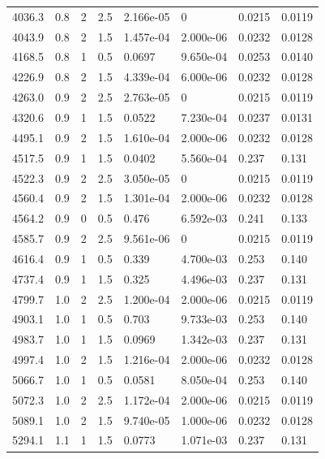 \documentclass[preview]{standalone}
\begin{document}
{{{\begin{tabular}{L{1.2cm}C{1.2cm} C{0.3cm}C{0.5cm} C{1.4cm}C{1.4cm} C{1.4cm}C{1.4cm}}
  4036.3  &   0.8  & 2     & 2.5 &  2.166e-05  & 0  & 0.0215 &  0.0119   \\ 
  4043.9  &   0.8  & 2     & 1.5 &  1.457e-04  & 2.000e-06  & 0.0232 &  0.0128   \\ 
  4168.5  &   0.8  & 1     & 0.5 &  0.0697  & 9.650e-04  & 0.0253 &  0.0140   \\ 
  4226.9  &   0.8  & 2     & 1.5 &  4.339e-04  & 6.000e-06  & 0.0232 &  0.0128   \\ 
  4263.0  &   0.9  & 2     & 2.5 &  2.763e-05  & 0  & 0.0215 &  0.0119   \\ 
  4320.6  &   0.9  & 1     & 1.5 &  0.0522  & 7.230e-04  & 0.0237 &  0.0131   \\ 
  4495.1  &   0.9  & 2     & 1.5 &  1.610e-04  & 2.000e-06  & 0.0232 &  0.0128   \\ 
  4517.5  &   0.9  & 1     & 1.5 &  0.0402  & 5.560e-04  & 0.237 &  0.131   \\ 
  4522.3  &   0.9  & 2     & 2.5 &  3.050e-05  & 0  & 0.0215 &  0.0119   \\ 
  4560.4  &   0.9  & 2     & 1.5 &  1.301e-04  & 2.000e-06  & 0.0232 &  0.0128   \\ 
  4564.2  &   0.9  & 0     & 0.5 &  0.476  & 6.592e-03  & 0.241 &  0.133   \\ 
  4585.7  &   0.9  & 2     & 2.5 &  9.561e-06  & 0  & 0.0215 &  0.0119   \\ 
  4616.4  &   0.9  & 1     & 0.5 &  0.339  & 4.700e-03  & 0.253 &  0.140   \\ 
  4737.4  &   0.9  & 1     & 1.5 &  0.325  & 4.496e-03  & 0.237 &  0.131   \\ 
  4799.7  &   1.0  & 2     & 2.5 &  1.200e-04  & 2.000e-06  & 0.0215 &  0.0119   \\ 
  4903.1  &   1.0  & 1     & 0.5 &  0.703  & 9.733e-03  & 0.253 &  0.140   \\ 
  4983.7  &   1.0  & 1     & 1.5 &  0.0969  & 1.342e-03  & 0.237 &  0.131   \\ 
  4997.4  &   1.0  & 2     & 1.5 &  1.216e-04  & 2.000e-06  & 0.0232 &  0.0128   \\ 
  5066.7  &   1.0  & 1     & 0.5 &  0.0581  & 8.050e-04  & 0.253 &  0.140   \\ 
  5072.3  &   1.0  & 2     & 2.5 &  1.172e-04  & 2.000e-06  & 0.0215 &  0.0119   \\ 
  5089.1  &   1.0  & 2     & 1.5 &  9.740e-05  & 1.000e-06  & 0.0232 &  0.0128   \\ 
  5294.1  &   1.1  & 1     & 1.5 &  0.0773  & 1.071e-03  & 0.237 &  0.131   \\ 

\end{tabular}}}}
\end{document}
